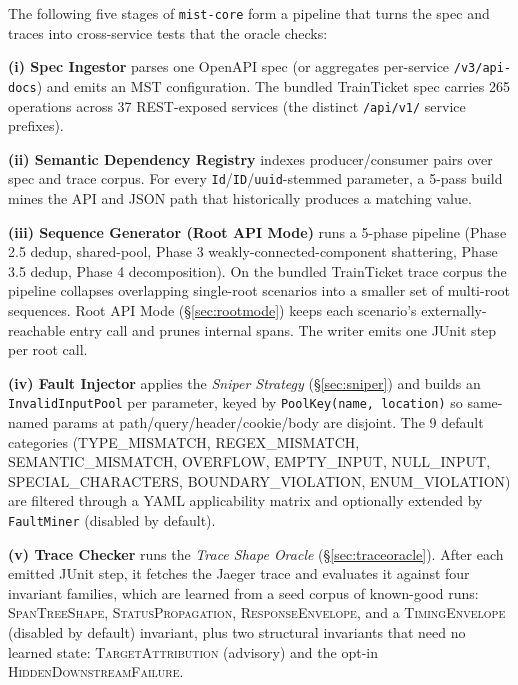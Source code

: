 \documentclass[sigconf,screen,review]{acmart}
\begin{document}
The following five stages of \texttt{mist-core} form a pipeline that turns the spec and traces into cross-service tests that the oracle checks:

\textbf{(i) Spec Ingestor} parses one OpenAPI spec (or aggregates per-service \texttt{/v3/api-docs}) and emits an MST configuration. The bundled TrainTicket spec carries 265 operations across 37 REST-exposed services (the distinct \texttt{/api/v1/} service prefixes).

\textbf{(ii) Semantic Dependency Registry} indexes producer/consumer pairs over spec and trace corpus. For every \texttt{Id}/\texttt{ID}/\texttt{uuid}-stemmed parameter, a 5-pass build mines the API and JSON path that historically produces a matching value.

\textbf{(iii) Sequence Generator (Root API Mode)} runs a 5-phase pipeline (Phase 2.5 dedup, shared-pool, Phase 3 weakly-connected-component shattering, Phase 3.5 dedup, Phase 4 decomposition). On the bundled TrainTicket trace corpus the pipeline collapses overlapping single-root scenarios into a smaller set of multi-root sequences. Root API Mode (\S\ref{sec:rootmode}) keeps each scenario's externally-reachable entry call and prunes internal spans. The writer emits one JUnit step per root call.

\textbf{(iv) Fault Injector} applies the \emph{Sniper Strategy} (\S\ref{sec:sniper}) and builds an \texttt{Invalid\-Input\-Pool} per parameter, keyed by \texttt{PoolKey(name, location)} so same-named params at path/query/header/cookie/body are disjoint. The 9 default categories (TYPE\_MISMATCH, REGEX\_\allowbreak MISMATCH, SEMANTIC\_MISMATCH, OVERFLOW, EMPTY\_\allowbreak INPUT, NULL\_\allowbreak INPUT, SPECIAL\_\allowbreak CHARACTERS, BOUNDARY\_\allowbreak VIOLATION, ENUM\_\allowbreak VIOLATION) are filtered through a YAML applicability matrix and optionally extended by \texttt{FaultMiner} (disabled by default).

\textbf{(v) Trace Checker} runs the \emph{Trace Shape Oracle} (\S\ref{sec:traceoracle}). After each emitted JUnit step, it fetches the Jaeger trace and evaluates it against four invariant families, which are learned from a seed corpus of known-good runs: \textsc{SpanTreeShape}, \textsc{StatusPropagation}, \textsc{ResponseEnvelope}, and a \textsc{TimingEnvelope} (disabled by default) invariant, plus two structural invariants that need no learned state: \textsc{TargetAttribution} (advisory) and the opt-in \textsc{HiddenDownstreamFailure}.

\end{document}
